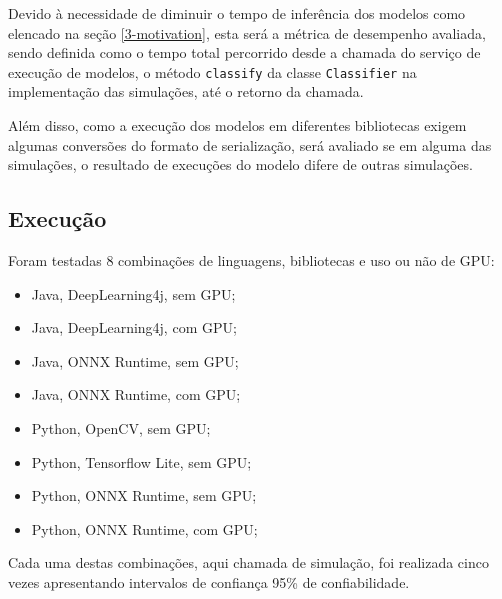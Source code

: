 Devido à necessidade de diminuir o tempo de inferência dos modelos como elencado na seção \ref{3-motivation}, esta será a métrica de desempenho avaliada, sendo definida como o tempo total percorrido desde a chamada do serviço de execução de modelos, o método \texttt{classify} da classe \texttt{Classifier} na implementação das simulações, até o retorno da chamada.

Além disso, como a execução dos modelos em diferentes bibliotecas exigem algumas conversões do formato de serialização, será avaliado se em alguma das simulações, o resultado de execuções do modelo difere de outras simulações.

\subsection{Execução}

Foram testadas 8 combinações de linguagens, bibliotecas e uso ou não de GPU:

\begin{itemize}
  \item Java, DeepLearning4j, sem GPU;
  \item Java, DeepLearning4j, com GPU;
  \item Java, ONNX Runtime, sem GPU;
  \item Java, ONNX Runtime, com GPU;
  \item Python, OpenCV, sem GPU;
  \item Python, Tensorflow Lite, sem GPU;
  \item Python, ONNX Runtime, sem GPU;
  \item Python, ONNX Runtime, com GPU;
\end{itemize}

Cada uma destas combinações, aqui chamada de simulação, foi realizada cinco vezes apresentando intervalos de confiança 95\% de confiabilidade.